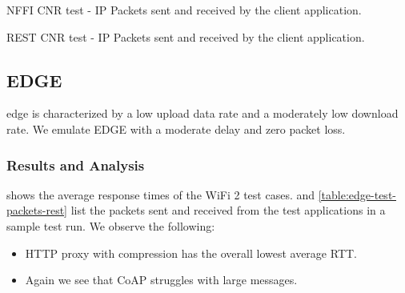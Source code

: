 \begin{table}[h]

\caption{NFFI CNR test - IP Packets sent and received by the client application.}
\label{table:cnr-test-packets-nffi}
\end{table}

\begin{table}[h]

\caption{REST CNR test - IP Packets sent and received by the client application.}
\label{table:cnr-test-packets-rest}
\end{table}


\subsection{EDGE}

\gls{edge} is characterized by a low upload data rate and a moderately low
download rate. We emulate EDGE with a moderate delay and zero packet loss.

\subsubsection{Results and Analysis}

 shows the average response times of the WiFi 2 test
cases.  and
\cref{table:edge-test-packets-rest} list the packets sent and received from the
test applications in a sample test run. We observe the following:

\begin{itemize}

    \item HTTP proxy with compression has the overall lowest average RTT.

    \item Again we see that CoAP struggles with large messages.


\end{itemize}

